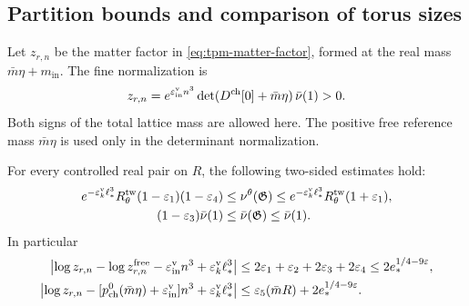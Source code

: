 \documentclass[11pt,letterpaper,reqno]{amsart}
\begin{document}
\subsection{Partition bounds and comparison of torus sizes}
\label{subsec:term-partition-bounds}

Let $z_{r,n}$ be the matter factor in
\eqref{eq:tpm-matter-factor}, formed at the real mass
$\bar m\eta+m_{\mathrm{in}}$. The fine normalization is
\begin{equation}\label{eq:term-matter-normalization}
 z_{r,n}
 =e^{\varepsilon_{\mathrm{in}}^{\rm v}n^3}
       \det(D^{\rm ch}[0]+\bar m\eta)\,\bar\nu(1)>0.
\end{equation}
Both signs of the total lattice mass are allowed here.
The positive free reference mass $\bar m\eta$ is used
only in the determinant normalization.

\begin{proposition}\label{prop:term-partition-bounds}
For every controlled real pair on $R$, the following
two-sided estimates hold:
\begin{align}
 e^{-\varepsilon_k^{\rm v}\ell_*^3}
 R_\theta^{\rm tw}(1-\varepsilon_1)(1-\varepsilon_4)
 &\le\nu^\theta(\mathfrak G)
 \le e^{-\varepsilon_k^{\rm v}\ell_*^3}
 R_\theta^{\rm tw}(1+\varepsilon_1),
                                   \label{eq:term-small-field-mass}\\
 (1-\varepsilon_3)\bar\nu(1)
 &\le\bar\nu(\mathfrak G)\le\bar\nu(1).
                                   \label{eq:term-full-mass}
\end{align}
In particular
\begin{align}
 \left|\log z_{r,n}-\log z_{r,n}^{\rm free}
       -\varepsilon_{\mathrm{in}}^{\rm v}n^3
                   +\varepsilon_k^{\rm v}\ell_*^3\right|
 &\le2\varepsilon_1+\varepsilon_2
                              +2\varepsilon_3+2\varepsilon_4
 \le2e_*^{1/4-9\varepsilon},\label{eq:term-partition-free-bound}\\
 \left|\log z_{r,n}
       -[p_{\rm ch}^0(\bar m\eta)
                     +\varepsilon_{\mathrm{in}}^{\rm v}]n^3
                    +\varepsilon_k^{\rm v}\ell_*^3\right|
 &\le\varepsilon_5(\bar mR)+2e_*^{1/4-9\varepsilon}.
                                   \label{eq:term-partition-pressure-bound}
\end{align}
\end{proposition}
\end{document}
